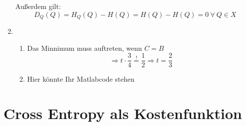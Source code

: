 \documentclass[DIN, pagenumber=false, fontsize=11pt, parskip=half]{scrartcl}
\begin{document}
\begin{enumerate}
			Außerdem gilt:
			\begin{equation*}
					D_Q(Q) = H_Q(Q) - H(Q) = H(Q) - H(Q) = 0 \ \forall \ Q \in X
			\end{equation*}
		\item
			\begin{enumerate}[label=(\alph*)]
				\item Das Minnimum muss auftreten, wenn $C=B$
						\begin{equation*}
								\Rightarrow t \cdot \frac{3}{4} \overset{!}{=} \frac{1}{2} \Rightarrow t = \frac{2}{3}
						\end{equation*}
				\item Hier könnte Ihr Matlabcode stehen
			\end{enumerate}
    \end{enumerate} 
	\section{Cross Entropy als Kostenfunktion}
\end{document}
